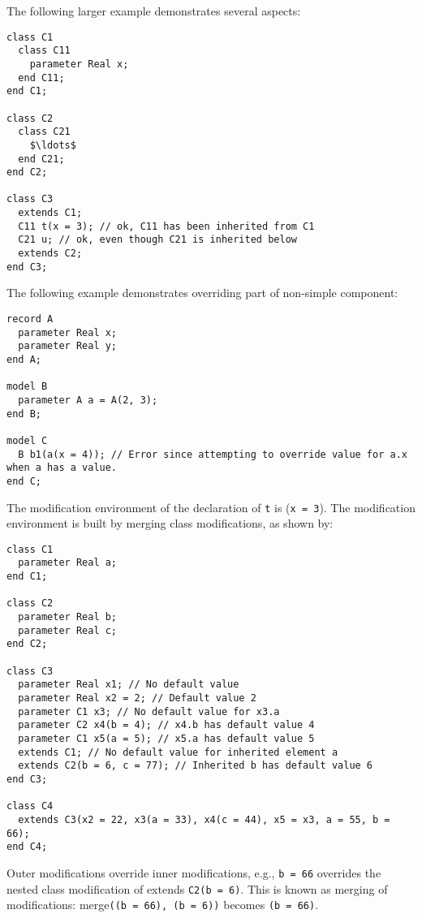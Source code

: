 \begin{example}
The following larger example demonstrates several aspects:
\begin{lstlisting}[language=modelica]
class C1
  class C11
    parameter Real x;
  end C11;
end C1;

class C2
  class C21
    $\ldots$
  end C21;
end C2;

class C3
  extends C1;
  C11 t(x = 3); // ok, C11 has been inherited from C1
  C21 u; // ok, even though C21 is inherited below
  extends C2;
end C3;
\end{lstlisting}
The following example demonstrates overriding part of non-simple component:
\begin{lstlisting}[language=modelica]
record A
  parameter Real x;
  parameter Real y;
end A;

model B
  parameter A a = A(2, 3);
end B;

model C
  B b1(a(x = 4)); // Error since attempting to override value for a.x when a has a value.
end C;
\end{lstlisting}

The modification environment of the declaration of \lstinline!t! is
(\lstinline!x = 3!). The modification environment is built by merging class modifications, as shown by:
\begin{lstlisting}[language=modelica]
class C1
  parameter Real a;
end C1;

class C2
  parameter Real b;
  parameter Real c;
end C2;

class C3
  parameter Real x1; // No default value
  parameter Real x2 = 2; // Default value 2
  parameter C1 x3; // No default value for x3.a
  parameter C2 x4(b = 4); // x4.b has default value 4
  parameter C1 x5(a = 5); // x5.a has default value 5
  extends C1; // No default value for inherited element a
  extends C2(b = 6, c = 77); // Inherited b has default value 6
end C3;

class C4
  extends C3(x2 = 22, x3(a = 33), x4(c = 44), x5 = x3, a = 55, b = 66);
end C4;
\end{lstlisting}

Outer modifications override inner modifications, e.g., \lstinline!b = 66!
overrides the nested class modification of extends \lstinline!C2(b = 6)!.
This is known as merging of modifications: merge\lstinline!((b = 66), (b = 6))!
becomes \lstinline!(b = 66)!.


\end{example}
